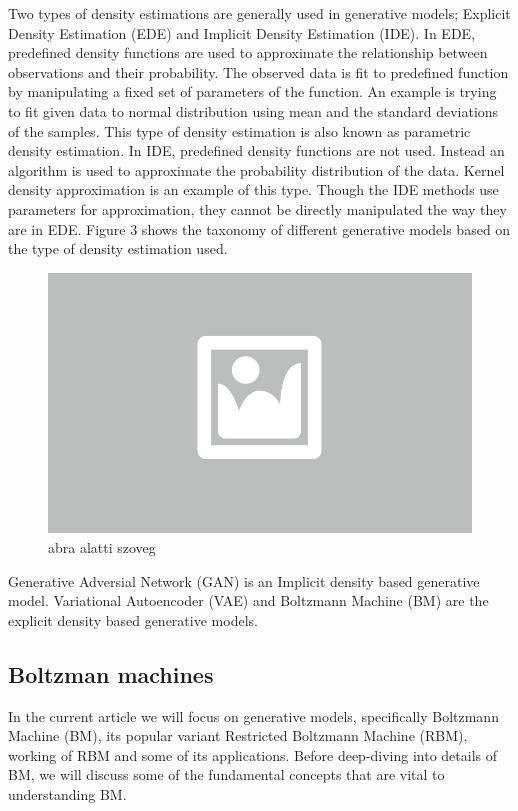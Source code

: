 Two types of density estimations are generally used in generative models; Explicit Density Estimation (EDE) and Implicit Density Estimation (IDE). In EDE, predefined density functions are used to approximate the relationship between observations and their probability. The observed data is fit to predefined function by manipulating a fixed set of parameters of the function. An example is trying to fit given data to normal distribution using mean and the standard deviations of the samples. This type of density estimation is also known as parametric density estimation. In IDE, predefined density functions are not used. Instead an algorithm is used to approximate the probability distribution of the data. Kernel density approximation is an example of this type. Though the IDE methods use parameters for approximation, they cannot be directly manipulated the way they are in EDE. Figure 3 shows the taxonomy of different generative models based on the type of density estimation used.

\begin{figure}[h]
	\centering
	\includegraphics[width=0.65\columnwidth]{figures/abra.png}
	\caption{abra alatti szoveg}
\end{figure}

Generative Adversial Network (GAN) is an Implicit density based generative model. Variational Autoencoder (VAE) and Boltzmann Machine (BM) are the explicit density based generative models.  


\subsection{Boltzman machines}

In the current article we will focus on generative models, specifically Boltzmann Machine (BM), its popular variant Restricted Boltzmann Machine (RBM), working of RBM and some of its applications. Before deep-diving into details of BM, we will discuss some of the fundamental concepts that are vital to understanding BM. 

